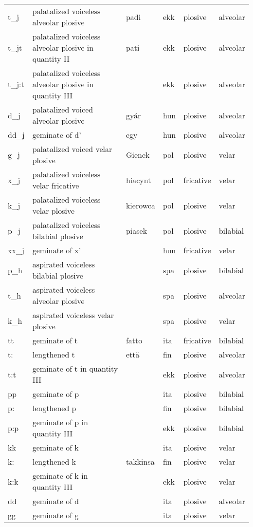 {\begin{longtable}{l|p{.3\linewidth}|p{.15\linewidth}|l|p{.15\linewidth}|l}
	t\_j	& palatalized voiceless alveolar plosive	& padi	& ekk	& plosive	& alveolar	\\
	t\_jt	& palatalized voiceless alveolar plosive in quantity II	& pati	& ekk	& plosive	& alveolar	\\
	t\_j:t	& palatalized voiceless alveolar plosive in quantity III	& 	& ekk	& plosive	& alveolar	\\
	d\_j	& palatalized voiced alveolar plosive	& gyár	& hun	& plosive	& alveolar	\\
	dd\_j	& geminate of d'	& egy	& hun	& plosive	& alveolar	\\
	g\_j	& palatalized voiced velar plosive	& Gienek	& pol	& plosive	& velar	\\
	x\_j	& palatalized voiceless velar fricative	& hiacynt	& pol	& fricative	& velar	\\
	k\_j	& palatalized voiceless velar plosive	& kierowca	& pol	& plosive	& velar	\\
	p\_j	& palatalized voiceless bilabial plosive	& piasek	& pol	& plosive	& bilabial	\\
	xx\_j	& geminate of x'	& 	& hun	& fricative	& velar	\\
	p\_h	& aspirated voiceless bilabial plosive	& 	& spa	& plosive	& bilabial	\\
	t\_h	& aspirated voiceless alveolar plosive	& 	& spa	& plosive	& alveolar	\\
	k\_h	& aspirated voiceless velar plosive	& 	& spa	& plosive	& velar	\\
	tt	& geminate of t	& fatto	& ita	& fricative	& bilabial	\\
	t:	& lengthened t	& että	& fin	& plosive	& alveolar	\\
	t:t	& geminate of t in quantity III	& 	& ekk	& plosive	& alveolar	\\
	pp	& geminate of p	& 	& ita	& plosive	& bilabial	\\
	p:	& lengthened p	& 	& fin	& plosive	& bilabial	\\
	p:p	& geminate of p in quantity III	& 	& ekk	& plosive	& bilabial	\\
	kk	& geminate of k	& 	& ita	& plosive	& velar	\\
	k:	& lengthened k	& takkinsa	& fin	& plosive	& velar	\\
	k:k	& geminate of k in quantity III	& 	& ekk	& plosive	& velar	\\
	dd	& geminate of d	& 	& ita	& plosive	& alveolar	\\
	gg	& geminate of g	& 	& ita	& plosive	& velar	\\

\end{longtable}}
